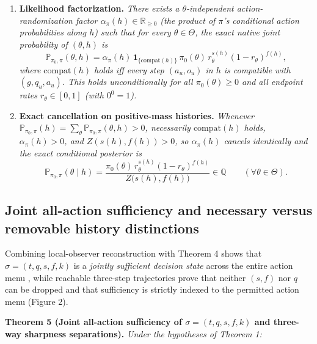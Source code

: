 \documentclass[11pt,letterpaper]{article}
\providecommand{\tightlist}{\setlength{\itemsep}{2pt}\setlength{\parskip}{0pt}}
\begin{document}
\begin{enumerate}
\def\labelenumi{\arabic{enumi}.}
\tightlist
\item
  \textbf{Likelihood factorization.} \emph{There exists a
  \(\theta\)-independent action-randomization factor
  \(\alpha_\pi(h) \in \mathbb{R}_{\ge 0}\) (the product of \(\pi\)'s
  conditional action probabilities along \(h\)) such that for every
  \(\theta \in \Theta\), the exact native joint probability of
  \((\theta, h)\) is}
  \[\mathbb{P}_{\pi_0, \pi}(\theta, h) = \alpha_\pi(h)\,\mathbf{1}_{\{\mathrm{compat}(h)\}}\, \pi_0(\theta)\, r_\theta^{s(h)} (1 - r_\theta)^{f(h)},\]
  \emph{where \(\mathrm{compat}(h)\) holds iff every step \((a_u, o_u)\)
  in \(h\) is compatible with \((g, q_u, a_u)\). This holds
  unconditionally for all \(\pi_0(\theta) \ge 0\) and all endpoint rates
  \(r_\theta \in [0,1]\) (with \(0^0 = 1\)).}
\item
  \textbf{Exact cancellation on positive-mass histories.} \emph{Whenever
  \(\mathbb{P}_{\pi_0, \pi}(h) = \sum_\theta \mathbb{P}_{\pi_0, \pi}(\theta, h) > 0\),
  necessarily \(\mathrm{compat}(h)\) holds, \(\alpha_\pi(h) > 0\), and
  \(Z(s(h), f(h)) > 0\), so \(\alpha_\pi(h)\) cancels identically and
  the exact conditional posterior is}
  \[\mathbb{P}_{\pi_0, \pi}(\theta \mid h) = \frac{\pi_0(\theta)\, r_\theta^{s(h)} (1 - r_\theta)^{f(h)}}{Z\bigl(s(h), f(h)\bigr)} \in \mathbb{Q} \qquad (\forall \theta \in \Theta).\]
\end{enumerate}

\subsection{Joint all-action sufficiency and necessary versus removable
history
distinctions}\label{joint-all-action-sufficiency-and-necessary-versus-removable-history-distinctions}

Combining local-observer reconstruction with Theorem 4 shows that
\(\sigma = (t, q, s, f, k)\) is a \emph{jointly sufficient decision
state} across the entire action menu
\citep{striebel1965, burkeRosenblatt1958, kemenySnell1960, givanDeanGreig2003},
while reachable three-step trajectories prove that neither \((s,f)\) nor
\(q\) can be dropped and that sufficiency is strictly indexed to the
permitted action menu (Figure 2).

\textbf{Theorem 5 (Joint all-action sufficiency of
\(\sigma = (t, q, s, f, k)\) and three-way sharpness separations).}
\emph{Under the hypotheses of Theorem 1:}
\end{document}
